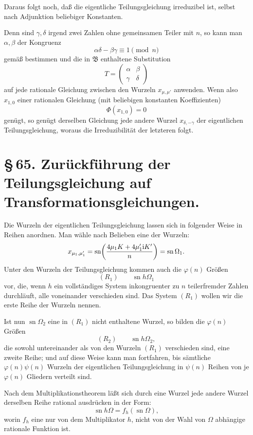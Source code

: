 \documentclass[11pt]{article}
\providecommand{\sn}{\operatorname{sn}}
\providecommand{\ii}{\mathrm{i}}
\begin{document}
Daraus folgt noch, daß die eigentliche Teilungsgleichung irreduzibel ist, selbst nach
Adjunktion beliebiger Konstanten.

Denn sind $\gamma,\delta$ irgend zwei Zahlen ohne gemeinsamen Teiler mit $n$, so kann man
$\alpha,\beta$ der Kongruenz
\[
 \alpha\delta-\beta\gamma\equiv1\pmod n
\]
gemäß bestimmen und die in $\mathfrak B$ enthaltene Substitution
\[
 T=\begin{pmatrix}\alpha&\beta\\ \gamma&\delta\end{pmatrix}
\]
auf jede rationale Gleichung zwischen den Wurzeln $x_{\mu,\mu'}$ anwenden. Wenn also
$x_{1,0}$ einer rationalen Gleichung (mit beliebigen konstanten Koeffizienten)
\[
 \Phi(x_{1,0})=0
\]
genügt, so genügt derselben Gleichung jede andere Wurzel $x_{\delta,-\gamma}$ der
eigentlichen Teilungsgleichung, woraus die Irreduzibilität der letzteren folgt.

\section*{\S\,65. Zurückführung der Teilungsgleichung auf Transformationsgleichungen.}

Die Wurzeln der eigentlichen Teilungsgleichung lassen sich in folgender Weise in Reihen
anordnen. Man wähle nach Belieben eine der Wurzeln:
\[
 x_{\mu_1,\mu'_1}=
 \sn\!\left({4\mu_1K+4\mu'_1\ii K'\over n}\right)=\sn\Omega_1.
\]
Unter den Wurzeln der Teilungsgleichung kommen auch die $\varphi(n)$ Größen
\[
 (R_1)\qquad \sn h\Omega_1
\]
vor, die, wenn $h$ ein vollständiges System inkongruenter zu $n$ teilerfremder Zahlen
durchläuft, alle voneinander verschieden sind. Das System $(R_1)$ wollen wir die erste
Reihe der Wurzeln nennen.

Ist nun $\sn\Omega_2$ eine in $(R_1)$ nicht enthaltene Wurzel, so bilden die $\varphi(n)$
Größen
\[
 (R_2)\qquad \sn h\Omega_2,
\]
die sowohl untereinander als von den Wurzeln $(R_1)$ verschieden sind, eine zweite Reihe;
und auf diese Weise kann man fortfahren, bis sämtliche $\varphi(n)\psi(n)$ Wurzeln der
eigentlichen Teilungsgleichung in $\psi(n)$ Reihen von je $\varphi(n)$ Gliedern verteilt sind.

Nach dem Multiplikationstheorem läßt sich durch eine Wurzel jede andere Wurzel derselben
Reihe rational ausdrücken in der Form:
\begin{equation}
 \sn h\Omega=f_h(\sn\Omega),
\tag{1}
\end{equation}
worin $f_h$ eine nur von dem Multiplikator $h$, nicht von der Wahl von $\Omega$ abhängige
rationale Funktion ist.
\end{document}

